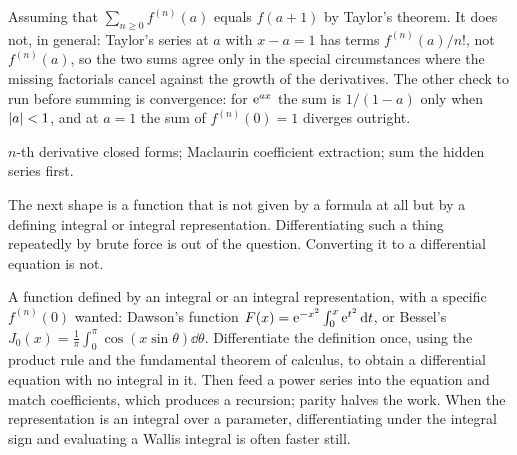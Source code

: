 \begin{trap}
Assuming that $\sum_{n\geq0}f^{(n)}(a)$ equals $f(a+1)$ by Taylor's theorem. It does not, in general: Taylor's series at $a$ with $x-a=1$ has terms $f^{(n)}(a)/n!$, not $f^{(n)}(a)$, so the two sums agree only in the special circumstances where the missing factorials cancel against the growth of the derivatives. The other check to run before summing is convergence: for $\mathrm{e}^{ax}$ the sum is $1/(1-a)$ only when $\left\lvert a\right\rvert<1$, and at $a=1$ the sum of $f^{(n)}(0)=1$ diverges outright.
\end{trap}

\begin{seealsob}$n$-th derivative closed forms; Maclaurin coefficient extraction; sum the hidden series first.\end{seealsob}

The next shape is a function that is not given by a formula at all but by a defining integral or integral representation. Differentiating such a thing repeatedly by brute force is out of the question. Converting it to a differential equation is not.

\cue A function defined by an integral or an integral representation, with a specific $f^{(n)}(0)$ wanted: Dawson's function $F(x)=\mathrm{e}^{-x^{2}}\int_{0}^{x}\mathrm{e}^{t^{2}}\,\mathrm{d} t$, or Bessel's $J_{0}(x)=\frac1\pi\int_{0}^{\pi}\cos(x\sin\theta)\dd\theta$.
\method Differentiate the definition once, using the product rule and the fundamental theorem of calculus, to obtain a differential equation with no integral in it. Then feed a power series into the equation and match coefficients, which produces a recursion; parity halves the work. When the representation is an integral over a parameter, differentiating under the integral sign and evaluating a Wallis integral is often faster still.

